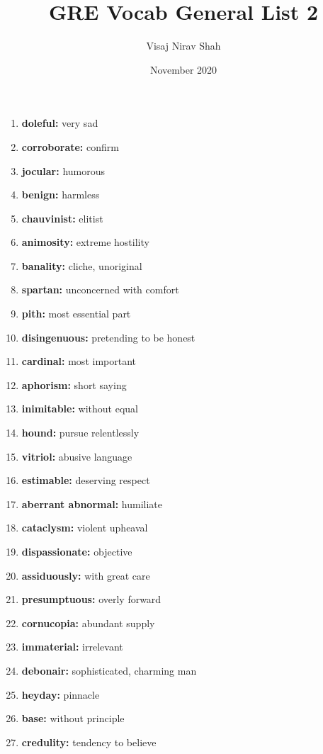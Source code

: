 \documentclass{article}
\title{\textbf{GRE Vocab General List 2}}
\author{Visaj Nirav Shah}
\date{November 2020}
\begin{document}
\maketitle

\begin{enumerate}
    \item \textbf{doleful: }{very sad}
    \item \textbf{corroborate: }{confirm}
    \item \textbf{jocular: }{humorous}
    \item \textbf{benign: }{harmless}
    \item \textbf{chauvinist: }{elitist}
    \item \textbf{animosity: }{extreme hostility}
    \item \textbf{banality: }{cliche, unoriginal}
    \item \textbf{spartan: }{unconcerned with comfort}
    \item \textbf{pith: }{most essential part}
    \item \textbf{disingenuous: }{pretending to be honest}
    \item \textbf{cardinal: }{most important}
    \item \textbf{aphorism: }{short saying}
    \item \textbf{inimitable: }{without equal}
    \item \textbf{hound: }{pursue relentlessly}
    \item \textbf{vitriol: }{abusive language}
    \item \textbf{estimable: }{deserving respect}
    \item \textbf{aberrant abnormal: }{humiliate}
    \item \textbf{cataclysm: }{violent upheaval}
    \item \textbf{dispassionate: }{objective}
    \item \textbf{assiduously: }{with great care}
    \item \textbf{presumptuous: }{overly forward}
    \item \textbf{cornucopia: }{abundant supply}
    \item \textbf{immaterial: }{irrelevant}
    \item \textbf{debonair: }{sophisticated, charming man}
    \item \textbf{heyday: }{pinnacle}
    \item \textbf{base: }{without principle}
    \item \textbf{credulity: }{tendency to believe}

\end{enumerate}
\end{document}
